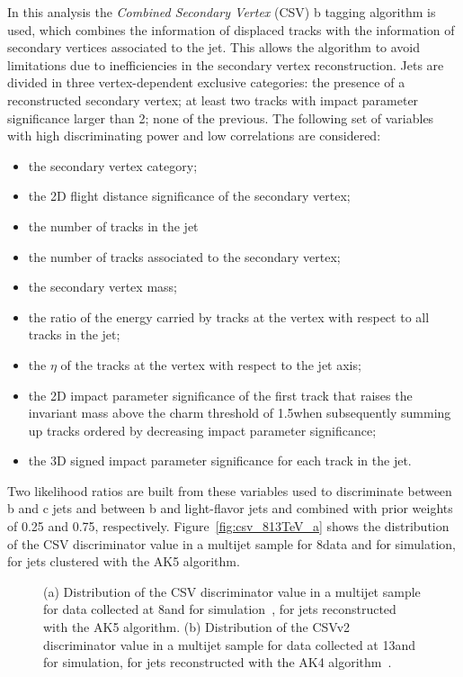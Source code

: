 In this analysis the \textit{Combined Secondary Vertex} (CSV) b tagging algorithm is used, which combines the information of displaced tracks with the information of secondary vertices associated to the jet.
This allows the algorithm to avoid limitations due to inefficiencies in the secondary vertex reconstruction. Jets are divided in three vertex-dependent exclusive categories: the presence of a reconstructed secondary vertex; at least two tracks with impact parameter significance larger than 2; none of the previous. The following set of variables with high discriminating power and low correlations are considered:

\begin{itemize}
\item the secondary vertex category;
\item the 2D flight distance significance of the secondary vertex;
\item the number of tracks in the jet
\item the number of tracks associated to the secondary vertex;
\item the secondary vertex mass;
\item the ratio of the energy carried by tracks at the vertex with respect to all tracks in the jet;
\item the $\eta$ of the tracks at the vertex with respect to the jet axis;
\item the 2D impact parameter significance of the first track that raises the invariant mass above the charm threshold of 1.5\GeV when subsequently summing up tracks ordered by decreasing impact parameter significance;
\item the 3D signed impact parameter significance for each track in the jet.
\end{itemize}

Two likelihood ratios are built from these variables used to discriminate between b and c jets and between b and light-flavor jets and combined with prior weights of 0.25 and 0.75, respectively. Figure~\ref{fig:csv_813TeV_a} shows the distribution of the CSV discriminator value in a multijet sample for 8\TeV data and for simulation, for jets clustered with the AK5 algorithm.

\begin{figure}[!htb]
\begin{center}
\end{center} 
\caption{(a) Distribution of the CSV discriminator value in a multijet sample for data collected at 8\TeV and for simulation~\cite{CMS:BTV13001}, for jets reconstructed with the AK5 algorithm. (b) Distribution of the CSVv2 discriminator value in a multijet sample for data collected at 13\TeV and for simulation, for jets reconstructed with the AK4 algorithm~\cite{CMS-PAS-BTV-15-001}.}
\label{fig:csv_813TeV}
\end{figure}

